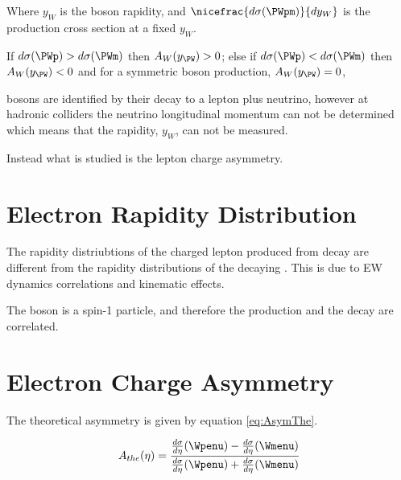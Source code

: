 Where $y_{W}$ is the boson rapidity, and 
$\nicefrac{ d\sigma (\PWpm) }{ dy_{W} }$ is the \PWpm production cross section
at a fixed $y_{W}$. 

If $d\sigma(\PWp) > d\sigma(\PWm) $ then $A_{W}(y_{\PW})> 0$;
else if $d\sigma(\PWp) < d\sigma(\PWm) $ then $A_{W}(y_{\PW})< 0$
and for a symmetric \PWpm boson production, $A_{W}(y_{\PW})= 0$,

\PW bosons are identified by their decay to a lepton plus neutrino, however at
hadronic colliders the neutrino longitudinal momentum can not be determined
which means that the \PW rapidity, $y_{W}$, can not be measured. 


Instead what is studied is the lepton charge asymmetry.

\section{Electron Rapidity Distribution}

The rapidity distriubtions of the charged lepton produced from \PW decay are
different from the rapidity distributions of the decaying \PW. This is due to
EW dynamics correlations and kinematic effects.

The \PW boson is a spin-1 particle, and therefore the production and the decay
are correlated. 




\section{Electron Charge Asymmetry}



\cite{phenom} The theoretical asymmetry is given by equation
\ref{eq:AsymThe}.

\begin{equation}
A_{the}(\eta)=\frac{  \frac{d\sigma}{d\eta}(\Wpenu) -
\frac{d\sigma}{d\eta}(\Wmenu) }{ \frac{d\sigma}{d\eta}(\Wpenu) +
\frac{d\sigma}{d\eta}(\Wmenu) }
\label{eq:AsymThe}
\end{equation} 

